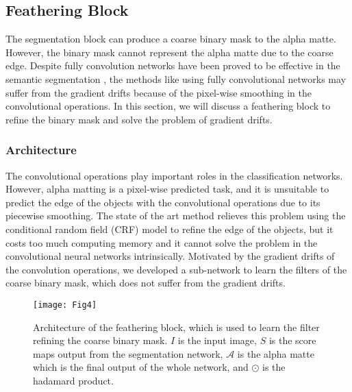\documentclass[sigconf]{acmart}
\begin{document}
\subsection{Feathering Block}
The segmentation block can produce a coarse binary mask to the alpha matte. However, the binary mask cannot represent the alpha matte due to the coarse edge. Despite fully convolution networks have been proved to be effective in the semantic segmentation \cite{long2015fully}, the methods like \cite{xu2017deep} using fully convolutional networks may suffer from the gradient drifts because of the pixel-wise smoothing in the convolutional operations. In this section, we will discuss a feathering block to refine the binary mask and solve the problem of gradient drifts.

\subsubsection{Architecture}
The convolutional operations play important roles in the classification networks. However, alpha matting is a pixel-wise predicted task, and it is unsuitable to predict the edge of the objects with the convolutional operations due to its piecewise smoothing. The state of the art method \cite{chen2014semantic} relieves this problem using the conditional random field (CRF) model to refine the edge of the objects, but it costs too much computing memory and it cannot solve the problem in the convolutional neural networks intrinsically. Motivated by the gradient drifts of the convolution operations, we developed a sub-network to learn the filters of the coarse binary mask, which does not suffer from the gradient drifts.

\begin{figure}
\texttt{[image: Fig4]}
\caption{Architecture of the feathering block, which is used to learn the filter refining the coarse binary mask. $I$ is the input image, $S$ is the score maps output from the segmentation network, $\mathscr{A}$ is the alpha matte which is the final output of the whole network, and $\odot $ is the hadamard product.}
\label{tab:FB}
\end{figure}
\end{document}

